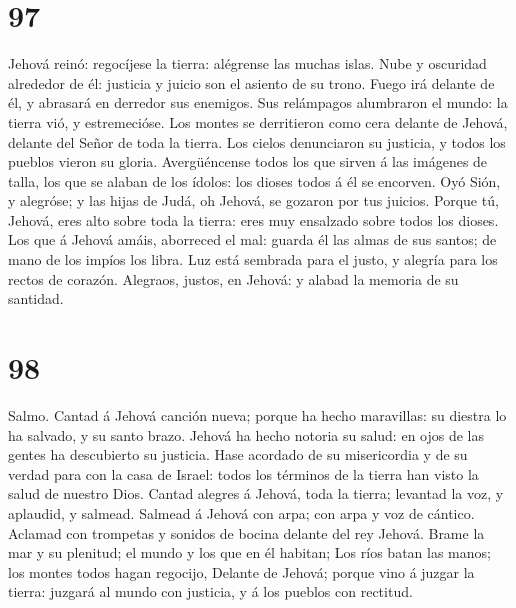 \hypertarget{section-96}{%
\section{97}\label{section-96}}

 Jehová reinó: regocíjese la tierra: alégrense las muchas
islas.  Nube y oscuridad alrededor de él: justicia y
juicio son el asiento de su trono.  Fuego irá delante de
él, y abrasará en derredor sus enemigos.  Sus relámpagos
alumbraron el mundo: la tierra vió, y estremecióse.  Los
montes se derritieron como cera delante de Jehová, delante del Señor de
toda la tierra.  Los cielos denunciaron su justicia, y
todos los pueblos vieron su gloria.  Avergüéncense todos
los que sirven á las imágenes de talla, los que se alaban de los ídolos:
los dioses todos á él se encorven.  Oyó Sión, y alegróse;
y las hijas de Judá, oh Jehová, se gozaron por tus juicios.
 Porque tú, Jehová, eres alto sobre toda la tierra: eres
muy ensalzado sobre todos los dioses.  Los que á Jehová
amáis, aborreced el mal: guarda él las almas de sus santos; de mano de
los impíos los libra.  Luz está sembrada para el justo, y
alegría para los rectos de corazón.  Alegraos, justos, en
Jehová: y alabad la memoria de su santidad.

\hypertarget{section-97}{%
\section{98}\label{section-97}}

 Salmo. Cantad á Jehová canción nueva; porque ha hecho
maravillas: su diestra lo ha salvado, y su santo brazo. 
Jehová ha hecho notoria su salud: en ojos de las gentes ha descubierto
su justicia.  Hase acordado de su misericordia y de su
verdad para con la casa de Israel: todos los términos de la tierra han
visto la salud de nuestro Dios.  Cantad alegres á Jehová,
toda la tierra; levantad la voz, y aplaudid, y salmead. 
Salmead á Jehová con arpa; con arpa y voz de cántico. 
Aclamad con trompetas y sonidos de bocina delante del rey Jehová.
 Brame la mar y su plenitud; el mundo y los que en él
habitan;  Los ríos batan las manos; los montes todos hagan
regocijo,  Delante de Jehová; porque vino á juzgar la
tierra: juzgará al mundo con justicia, y á los pueblos con rectitud.

